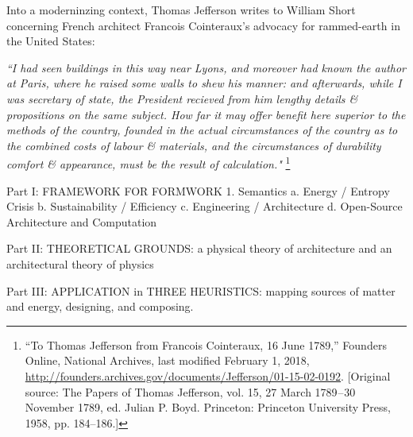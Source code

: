 Into a moderninzing context, Thomas Jefferson writes to William Short concerning French architect Francois Cointeraux's advocacy for rammed-earth in the United States:

\begin{flushright}
\small{
\textit{``I had seen buildings in this way near Lyons, and moreover had known the author at Paris, where he raised some walls to shew his manner: and afterwards, while I was secretary of state, the President recieved from him lengthy details \& propositions on the same subject. How far it may offer benefit here superior to the methods of the country, founded in the actual circumstances of the country as to the combined costs of labour \& materials, and the circumstances of durability comfort \& appearance, must be the result of calculation."}} \footnote{“To Thomas Jefferson from Francois Cointeraux, 16 June 1789,” Founders Online, National Archives, last modified February 1, 2018, \url{http://founders.archives.gov/documents/Jefferson/01-15-02-0192}. [Original source: The Papers of Thomas Jefferson, vol. 15, 27 March 1789 – 30 November 1789, ed. Julian P. Boyd. Princeton: Princeton University Press, 1958, pp. 184–186.]}
\end{flushright}

\clearpage

Part I: FRAMEWORK FOR FORMWORK
  1. Semantics
    a. Energy / Entropy Crisis
    b. Sustainability / Efficiency
    c. Engineering / Architecture
    d. Open-Source Architecture and Computation


Part II: THEORETICAL GROUNDS: a physical theory of architecture and an architectural theory of physics

Part III: APPLICATION in THREE HEURISTICS: mapping sources of matter and energy, designing, and composing.
